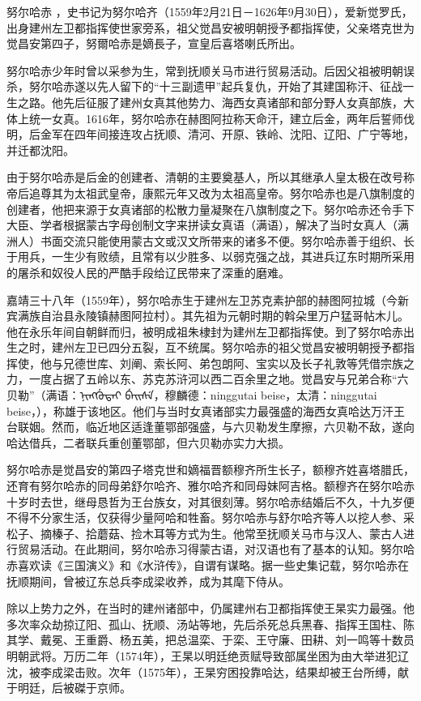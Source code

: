 努尔哈赤 ，史书记为努尔哈齐（1559年2月21日－1626年9月30日），爱新觉罗氏，出身建州左卫都指挥使世家旁系，祖父觉昌安被明朝授予都指挥使，父亲塔克世为觉昌安第四子，努爾哈赤是嫡長子，宣皇后喜塔喇氏所出。

努尔哈赤少年时曾以采参为生，常到抚顺关马市进行贸易活动。后因父祖被明朝误杀，努尔哈赤遂以先人留下的“十三副遗甲”起兵复仇，开始了其建国称汗、征战一生之路。他先后征服了建州女真其他势力、海西女真诸部和部分野人女真部族，大体上统一女真。1616年，努尔哈赤在赫图阿拉称天命汗，建立后金，两年后誓师伐明，后金军在四年间接连攻占抚顺、清河、开原、铁岭、沈阳、辽阳、广宁等地，并迁都沈阳。

由于努尔哈赤是后金的创建者、清朝的主要奠基人，所以其继承人皇太极在改号称帝后追尊其为太祖武皇帝，康熙元年又改为太祖高皇帝。努尔哈赤也是八旗制度的创建者，他把来源于女真诸部的松散力量凝聚在八旗制度之下。努尔哈赤还令手下大臣、学者根据蒙古字母创制文字来拼读女真语（满语），解决了当时女真人（满洲人）书面交流只能使用蒙古文或汉文所带来的诸多不便。努尔哈赤善于组织、长于用兵，一生少有败绩，且常有以少胜多、以弱克强之战，其进兵辽东时期所采用的屠杀和奴役人民的严酷手段给辽民带来了深重的磨难。

嘉靖三十八年（1559年），努尔哈赤生于建州左卫苏克素护部的赫图阿拉城（今新宾满族自治县永陵镇赫图阿拉村）。其先祖为元朝时期的斡朵里万户猛哥帖木儿。他在永乐年间自朝鲜而归，被明成祖朱棣封为建州左卫都指挥使。到了努尔哈赤出生之时，建州左卫已四分五裂，互不统属。努尔哈赤的祖父觉昌安被明朝授予都指挥使，他与兄德世库、刘阐、索长阿、弟包朗阿、宝实以及长子礼敦等凭借宗族之力，一度占据了五岭以东、苏克苏浒河以西二百余里之地。觉昌安与兄弟合称“六贝勒”（满语：ᠨᡳᠩᡤᡠᡨᠠᡳ
ᠪᡝᡳᠰᡝ，穆麟德：ninggutai beise，太清：ninggutai beise，），称雄于该地区。他们与当时女真诸部实力最强盛的海西女真哈达万汗王台联姻。然而，临近地区适逢董鄂部强盛，与六贝勒发生摩擦，六贝勒不敌，遂向哈达借兵，二者联兵重创董鄂部，但六贝勒亦实力大损。

努尔哈赤是觉昌安的第四子塔克世和嫡福晋额穆齐所生长子，额穆齐姓喜塔腊氏，还育有努尔哈赤的同母弟舒尔哈齐、雅尔哈齐和同母妹阿吉格。额穆齐在努尔哈赤十岁时去世，继母恳哲为王台族女，对其很刻薄。努尔哈赤结婚后不久，十九岁便不得不分家生活，仅获得少量阿哈和牲畜。努尔哈赤与舒尔哈齐等人以挖人参、采松子、摘榛子、拾蘑菇、捡木耳等方式为生。他常至抚顺关马市与汉人、蒙古人进行贸易活动。在此期间，努尔哈赤习得蒙古语，对汉语也有了基本的认知。努尔哈赤喜欢读《三国演义》和《水浒传》，自谓有谋略。据一些史集记载，努尔哈赤在抚顺期间，曾被辽东总兵李成梁收养，成为其麾下侍从。

除以上势力之外，在当时的建州诸部中，仍属建州右卫都指挥使王杲实力最强。他多次率众劫掠辽阳、孤山、抚顺、汤站等地，先后杀死总兵黑春、指挥王国柱、陈其学、戴冕、王重爵、杨五美，把总温栾、于栾、王守廉、田耕、刘一鸣等十数员明朝武将。万历二年（1574年），王杲以明廷绝贡赋导致部属坐困为由大举进犯辽沈，被李成梁击败。次年（1575年），王杲穷困投靠哈达，结果却被王台所缚，献于明廷，后被磔于京师。

